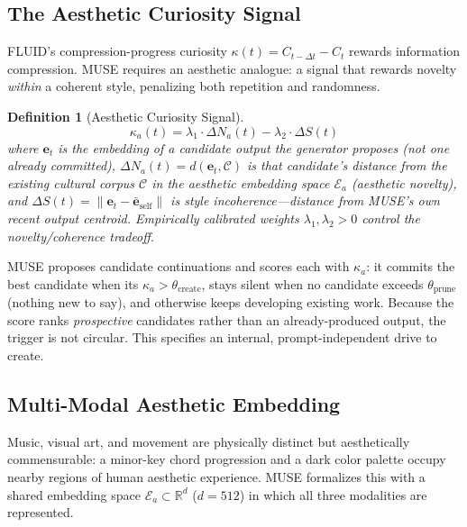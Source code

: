 \documentclass[12pt]{article}
\newtheorem{definition}{Definition}
\begin{document}
\subsection{The Aesthetic Curiosity Signal}

FLUID's compression-progress curiosity $\kappa(t) = C_{t-\Delta t} - C_t$ rewards information compression. MUSE requires an aesthetic analogue: a signal that rewards novelty \textit{within} a coherent style, penalizing both repetition and randomness.

\begin{definition}[Aesthetic Curiosity Signal]
\begin{equation}
\kappa_a(t) = \lambda_1 \cdot \Delta N_a(t) - \lambda_2 \cdot \Delta S(t)
\end{equation}
where $\mathbf{e}_t$ is the embedding of a \emph{candidate} output the generator proposes (not one already committed), $\Delta N_a(t) = d(\mathbf{e}_{t}, \mathcal{C})$ is that candidate's distance from the existing cultural corpus $\mathcal{C}$ in the aesthetic embedding space $\mathcal{E}_a$ (aesthetic novelty), and $\Delta S(t) = \|\mathbf{e}_t - \bar{\mathbf{e}}_{\text{self}}\|$ is style incoherence---distance from MUSE's own recent output centroid. Empirically calibrated weights $\lambda_1, \lambda_2 > 0$ control the novelty/coherence tradeoff.
\end{definition}

MUSE proposes candidate continuations and scores each with $\kappa_a$: it commits the best candidate when its $\kappa_a > \theta_{\text{create}}$, stays silent when no candidate exceeds $\theta_{\text{prune}}$ (nothing new to say), and otherwise keeps developing existing work. Because the score ranks \emph{prospective} candidates rather than an already-produced output, the trigger is not circular. This specifies an internal, prompt-independent drive to create.

\subsection{Multi-Modal Aesthetic Embedding}

Music, visual art, and movement are physically distinct but aesthetically commensurable: a minor-key chord progression and a dark color palette occupy nearby regions of human aesthetic experience. MUSE formalizes this with a shared embedding space $\mathcal{E}_a \subset \mathbb{R}^d$ ($d = 512$) in which all three modalities are represented.
\end{document}
